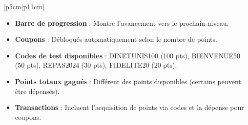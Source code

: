 \begin{longtable}{|p{5cm}|p{11cm}|}
\begin{minipage}{\linewidth}
\begin{itemize}
\begin{itemize}
  \end{itemize}
\item \textbf{Barre de progression} : Montre l'avancement vers le prochain niveau.
\item \textbf{Coupons} : Débloqués automatiquement selon le nombre de points.
\item \textbf{Codes de test disponibles} : DINETUNIS100 (100 pts), BIENVENUE50 (50 pts), REPAS2024 (30 pts), FIDELITE20 (20 pts).
\item \textbf{Points totaux gagnés} : Différent des points disponibles (certains peuvent être dépensés).
\item \textbf{Transactions} : Incluent l'acquisition de points via codes et la dépense pour coupons.
\end{itemize}
\end{minipage} \\ 
\hline
\caption{Description textuelle complète – Consulter les points et le niveau de fidélité}
\end{longtable}